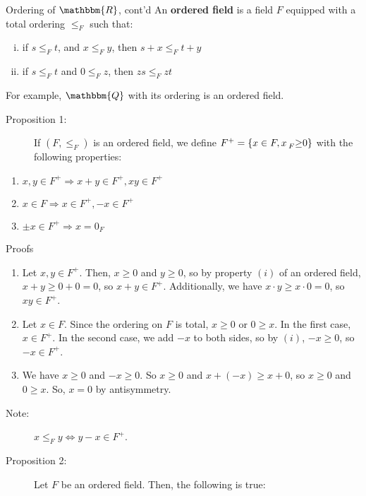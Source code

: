 \documentclass[10pt]{extarticle}
\newcommand{\Q}{\mathbbm{Q}}
\newcommand{\R}{\mathbbm{R}}
\begin{document}
  \begin{problem}{Ordering of $\R$, cont'd}
    An \textbf{ordered field} is a field $F$ equipped with a total ordering $\leq_{F}$ such that:
    \begin{enumerate}[(i)]
      \item if $s\leq_{F} t$, and $x\leq_{F} y$, then $s + x \leq_{F} t + y$
      \item if $s\leq_{F} t$ and $0\leq_{F} z$, then $zs\leq_{F} zt$
    \end{enumerate}
    For example, $\Q$ with its ordering is an ordered field.\\
    \begin{description}
      \item[Proposition 1:] If $(F,\leq_F)$ is an ordered field, we define $F^+ = \{x\in F,x\prescript{}{F}\geq 0\}$ with the following properties:
    \end{description}
    \begin{enumerate}[(1)]
      \item $x,y\in F^+ \Rightarrow x+y\in F^+,xy\in F^+$
      \item $x\in F \Rightarrow x\in F^+,-x\in F^+$
      \item $\pm x\in F^+ \Rightarrow x = 0_F$
    \end{enumerate}
    \begin{problem}{Proofs}
      \begin{enumerate}[(1)]
        \item Let $x,y\in F^+$. Then, $x\geq 0$  and $y\geq 0$, so by property $(i)$ of an ordered field, $x+y\geq 0+0 = 0$, so $x+y\in F^+$. Additionally, we have $x\cdot y \geq x\cdot 0 = 0$, so $xy \in F^+$.
        \item Let $x\in F$. Since the ordering on $F$ is total, $x \geq 0$ or $0\geq x$. In the first case, $x\in F^+$. In the second case, we add $-x$ to both sides, so by $(i)$, $-x\geq 0$, so $-x\in F^+$.
        \item We have $x\geq 0$  and $-x\geq 0$. So $x \geq 0$ and $x + (-x) \geq x+0$, so $x\geq 0$ and $0\geq x$. So, $x = 0$ by antisymmetry.
      \end{enumerate}
    \end{problem}
    \begin{description}
      \item[Note:] $x\leq_F y \Leftrightarrow y-x\in F^+$.
    \end{description}
    \begin{description}
      \item[Proposition 2:] Let $F$ be an ordered field. Then, the following is true:

\end{description}
\end{problem}
\end{document}
